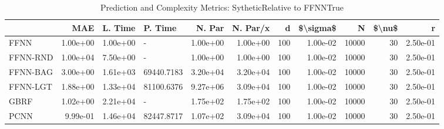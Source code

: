 \begin{table}
\centering
\caption{Prediction and Complexity Metrics: SytheticRelative to FFNNTrue}
\label{tab__Sythetic__Fix_Neurons_QTrue}
\begin{tabular}{lrrlrrrrrrr}
\toprule
{} &      MAE &  L. Time &     P. Time &   N. Par &  N. Par/x &    d &  \$\textbackslash sigma\$ &      N &  \$\textbackslash nu\$ &        r \\
\midrule
FFNN     & 1.00e+00 & 1.00e+00 &           - & 1.00e+00 &  1.00e+00 &  100 &  1.00e-02 &  10000 &     30 & 2.50e-01 \\
FFNN-RND & 1.00e+04 & 7.50e+00 &           - & 1.00e+00 &  1.00e+00 &  100 &  1.00e-02 &  10000 &     30 & 2.50e-01 \\
FFNN-BAG & 3.00e+00 & 1.61e+03 &  69440.7183 & 3.20e+04 &  3.20e+04 &  100 &  1.00e-02 &  10000 &     30 & 2.50e-01 \\
FFNN-LGT & 1.88e+00 & 1.33e+04 &  81100.6376 & 9.27e+06 &  3.09e+04 &  100 &  1.00e-02 &  10000 &     30 & 2.50e-01 \\
GBRF     & 1.02e+00 & 2.21e+04 &           - & 1.75e+02 &  1.75e+02 &  100 &  1.00e-02 &  10000 &     30 & 2.50e-01 \\
PCNN     & 9.99e-01 & 1.46e+04 &  82447.8717 & 1.07e+02 &  3.09e+04 &  100 &  1.00e-02 &  10000 &     30 & 2.50e-01 \\
\bottomrule
\end{tabular}
\end{table}
